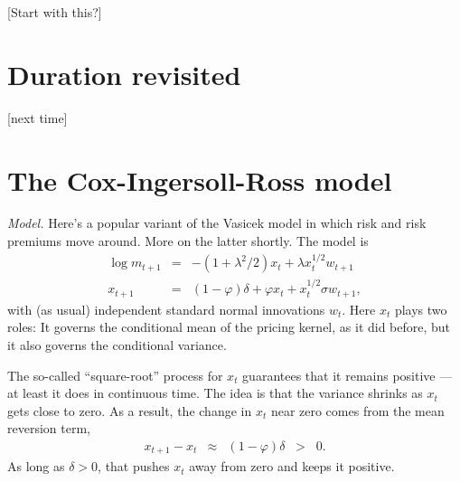 \documentclass[11pt]{article}
\begin{document}
[Start with this?]


\section{Duration revisited}


[next time]


\section{The Cox-Ingersoll-Ross model}


{\it Model.\/}
Here's a popular variant of the Vasicek model
in which risk and risk premiums move around.
More on the latter shortly.
The model is
\begin{eqnarray*}
    \log m_{t+1} &=& - (1+\lambda^2/2 ) x_t + \lambda x_t^{1/2} w_{t+1} \\
         x_{t+1} &=& (1-\varphi) \delta + \varphi x_t + x_t^{1/2} \sigma w_{t+1} ,
\end{eqnarray*}
with (as usual) independent standard normal innovations $w_t$.
Here $x_t$ plays two roles:  It governs the conditional mean
of the pricing kernel, as it did before,
but it also governs the conditional variance.

The so-called ``square-root'' process for $x_t$ guarantees that
it remains positive --- at least it does in continuous time.
The idea is that the variance shrinks as $x_t$ gets close to zero.
As a result, the change in $x_t$ near zero comes from the mean reversion term,
\begin{eqnarray*}
       x_{t+1} - x_t  &\approx& (1-\varphi) \delta  \;\;>\;\; 0.
\end{eqnarray*}
As long as $\delta>0$, that pushes $x_t$ away from zero and keeps it positive.
\end{document}
